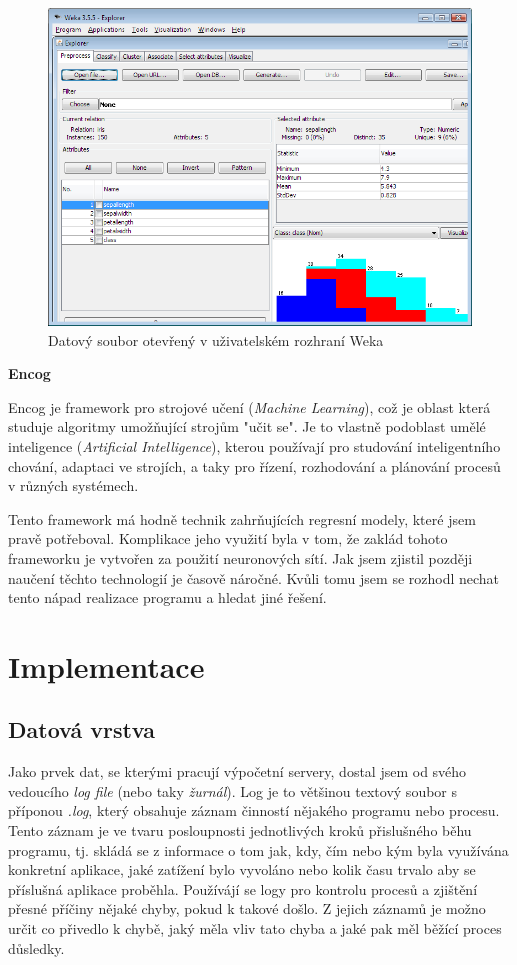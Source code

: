 \documentclass[a4paper,12pt,twoside]{scrreprt}
\begin{document}
\begin{figure}[h]
  \centering
  \includegraphics[width=15cm]{pictures/weka.png}
  \caption{Datový soubor otevřený v uživatelském rozhraní Weka}
  \label{fig:weka}
\end{figure}

\textbf{Encog}

Encog je framework pro strojové učení (\textit{Machine Learning}), což je oblast která studuje algoritmy umožňující strojům "učit se". Je to vlastně podoblast umělé inteligence (\textit{Artificial Intelligence}), kterou používají pro studování inteligentního chování, adaptaci ve strojích, a taky pro řízení, rozhodování a plánování procesů v různých systémech.

Tento framework má hodně technik zahrňujících regresní modely, které jsem pravě potřeboval. Komplikace jeho využití byla v tom, že zaklád tohoto frameworku je vytvořen za použití neuronových sítí. Jak jsem zjistil později naučení těchto technologií je časově náročné. Kvůli tomu jsem se rozhodl nechat tento nápad realizace programu a hledat jiné řešení. 


\newpage
\section{Implementace}
\subsection{Datová vrstva}
Jako prvek dat, se kterými pracují výpočetní servery, dostal jsem od svého vedoucího \textit{log file} (nebo taky \textit{žurnál}). Log je to většinou textový soubor s příponou \textit{.log}, který obsahuje záznam činností nějakého programu nebo procesu. Tento záznam je ve tvaru posloupnosti jednotlivých kroků přislušného běhu programu, tj. skládá se z informace o tom jak, kdy, čím nebo kým byla využívána konkretní aplikace, jaké zatížení bylo vyvoláno nebo kolik času trvalo aby se příslušná aplikace proběhla. Používájí se logy pro kontrolu procesů a zjištění přesné příčiny nějaké chyby, pokud k takové došlo. Z jejich záznamů je možno určit co přivedlo k chybě, jaký měla vliv tato chyba a jaké pak měl běžící proces důsledky. 
\end{document}

